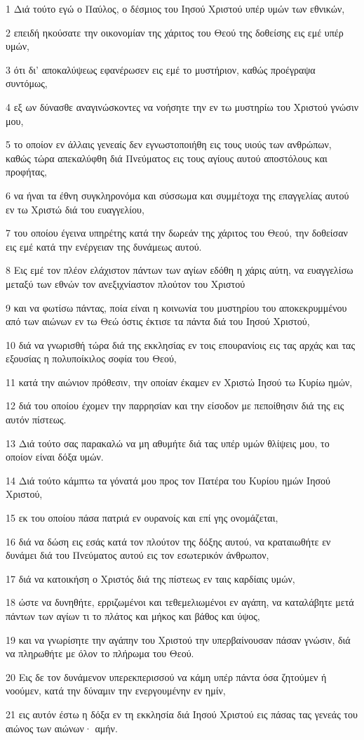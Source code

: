\par 1 Διά τούτο εγώ ο Παύλος, ο δέσμιος του Ιησού Χριστού υπέρ υμών των εθνικών,
\par 2 επειδή ηκούσατε την οικονομίαν της χάριτος του Θεού της δοθείσης εις εμέ υπέρ υμών,
\par 3 ότι δι' αποκαλύψεως εφανέρωσεν εις εμέ το μυστήριον, καθώς προέγραψα συντόμως,
\par 4 εξ ων δύνασθε αναγινώσκοντες να νοήσητε την εν τω μυστηρίω του Χριστού γνώσιν μου,
\par 5 το οποίον εν άλλαις γενεαίς δεν εγνωστοποιήθη εις τους υιούς των ανθρώπων, καθώς τώρα απεκαλύφθη διά Πνεύματος εις τους αγίους αυτού αποστόλους και προφήτας,
\par 6 να ήναι τα έθνη συγκληρονόμα και σύσσωμα και συμμέτοχα της επαγγελίας αυτού εν τω Χριστώ διά του ευαγγελίου,
\par 7 του οποίου έγεινα υπηρέτης κατά την δωρεάν της χάριτος του Θεού, την δοθείσαν εις εμέ κατά την ενέργειαν της δυνάμεως αυτού.
\par 8 Εις εμέ τον πλέον ελάχιστον πάντων των αγίων εδόθη η χάρις αύτη, να ευαγγελίσω μεταξύ των εθνών τον ανεξιχνίαστον πλούτον του Χριστού
\par 9 και να φωτίσω πάντας, ποία είναι η κοινωνία του μυστηρίου του αποκεκρυμμένου από των αιώνων εν τω Θεώ όστις έκτισε τα πάντα διά του Ιησού Χριστού,
\par 10 διά να γνωρισθή τώρα διά της εκκλησίας εν τοις επουρανίοις εις τας αρχάς και τας εξουσίας η πολυποίκιλος σοφία του Θεού,
\par 11 κατά την αιώνιον πρόθεσιν, την οποίαν έκαμεν εν Χριστώ Ιησού τω Κυρίω ημών,
\par 12 διά του οποίου έχομεν την παρρησίαν και την είσοδον με πεποίθησιν διά της εις αυτόν πίστεως.
\par 13 Διά τούτο σας παρακαλώ να μη αθυμήτε διά τας υπέρ υμών θλίψεις μου, το οποίον είναι δόξα υμών.
\par 14 Διά τούτο κάμπτω τα γόνατά μου προς τον Πατέρα του Κυρίου ημών Ιησού Χριστού,
\par 15 εκ του οποίου πάσα πατριά εν ουρανοίς και επί γης ονομάζεται,
\par 16 διά να δώση εις εσάς κατά τον πλούτον της δόξης αυτού, να κραταιωθήτε εν δυνάμει διά του Πνεύματος αυτού εις τον εσωτερικόν άνθρωπον,
\par 17 διά να κατοικήση ο Χριστός διά της πίστεως εν ταις καρδίαις υμών,
\par 18 ώστε να δυνηθήτε, ερριζωμένοι και τεθεμελιωμένοι εν αγάπη, να καταλάβητε μετά πάντων των αγίων τι το πλάτος και μήκος και βάθος και ύψος,
\par 19 και να γνωρίσητε την αγάπην του Χριστού την υπερβαίνουσαν πάσαν γνώσιν, διά να πληρωθήτε με όλον το πλήρωμα του Θεού.
\par 20 Εις δε τον δυνάμενον υπερεκπερισσού να κάμη υπέρ πάντα όσα ζητούμεν ή νοούμεν, κατά την δύναμιν την ενεργουμένην εν ημίν,
\par 21 εις αυτόν έστω η δόξα εν τη εκκλησία διά Ιησού Χριστού εις πάσας τας γενεάς του αιώνος των αιώνων· αμήν.

